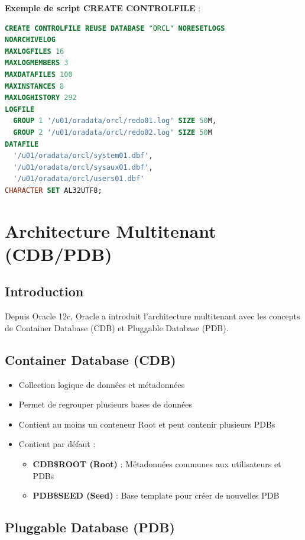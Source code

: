 \documentclass[12pt,a4paper]{article}
\begin{document}
\textbf{Exemple de script CREATE CONTROLFILE} :
\begin{lstlisting}[language=SQL]
CREATE CONTROLFILE REUSE DATABASE "ORCL" NORESETLOGS
NOARCHIVELOG
MAXLOGFILES 16
MAXLOGMEMBERS 3
MAXDATAFILES 100
MAXINSTANCES 8
MAXLOGHISTORY 292
LOGFILE
  GROUP 1 '/u01/oradata/orcl/redo01.log' SIZE 50M,
  GROUP 2 '/u01/oradata/orcl/redo02.log' SIZE 50M
DATAFILE
  '/u01/oradata/orcl/system01.dbf',
  '/u01/oradata/orcl/sysaux01.dbf',
  '/u01/oradata/orcl/users01.dbf'
CHARACTER SET AL32UTF8;
\end{lstlisting}

\section{Architecture Multitenant (CDB/PDB)}

\subsection{Introduction}

Depuis Oracle 12c, Oracle a introduit l'architecture multitenant avec les concepts de Container Database (CDB) et Pluggable Database (PDB).

\subsection{Container Database (CDB)}

\begin{itemize}
    \item Collection logique de données et métadonnées
    \item Permet de regrouper plusieurs bases de données
    \item Contient au moins un conteneur Root et peut contenir plusieurs PDBs
    \item Contient par défaut :
    \begin{itemize}
        \item \textbf{CDB\$ROOT (Root)} : Métadonnées communes aux utilisateurs et PDBs
        \item \textbf{PDB\$SEED (Seed)} : Base template pour créer de nouvelles PDB
    \end{itemize}
\end{itemize}

\subsection{Pluggable Database (PDB)}
\end{document}
